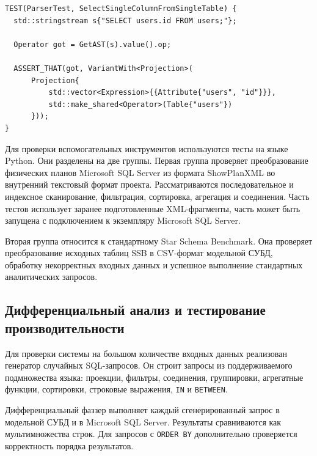 \documentclass[14pt, russian]{scrartcl}
\begin{document}
\begin{listing}[H]
  \caption{Пример модульного теста.}
  \label{lst:googletest}
  \begin{verbatim}
TEST(ParserTest, SelectSingleColumnFromSingleTable) {
  std::stringstream s{"SELECT users.id FROM users;"};

  Operator got = GetAST(s).value().op;

  ASSERT_THAT(got, VariantWith<Projection>(
      Projection{
          std::vector<Expression>{{Attribute{"users", "id"}}},
          std::make_shared<Operator>(Table{"users"})
      }));
}
  \end{verbatim}
\end{listing}

Для проверки вспомогательных инструментов используются тесты на языке Python.
Они разделены на две группы. Первая группа проверяет преобразование физических
планов Microsoft SQL Server из формата ShowPlanXML во внутренний текстовый
формат проекта. Рассматриваются последовательное и индексное сканирование,
фильтрация, сортировка, агрегация и соединения. Часть тестов использует заранее
подготовленные XML-фрагменты, часть может быть запущена с подключением к
экземпляру Microsoft SQL Server.

Вторая группа относится к стандартному Star Schema Benchmark. Она проверяет
преобразование исходных таблиц SSB в CSV-формат модельной СУБД, обработку
некорректных входных данных и успешное выполнение стандартных аналитических
запросов.

\subsection{Дифференциальный анализ и тестирование производительности}

Для проверки системы на большом количестве входных данных реализован генератор
случайных SQL-запросов. Он строит запросы из поддерживаемого подмножества языка:
проекции, фильтры, соединения, группировки, агрегатные функции, сортировки,
строковые выражения, \verb|IN| и \verb|BETWEEN|.


Дифференциальный фаззер выполняет каждый сгенерированный запрос в модельной СУБД
и в Microsoft SQL Server. Результаты сравниваются как мультимножества строк. Для
запросов с \verb|ORDER BY| дополнительно проверяется корректность порядка
результатов.
\end{document}
